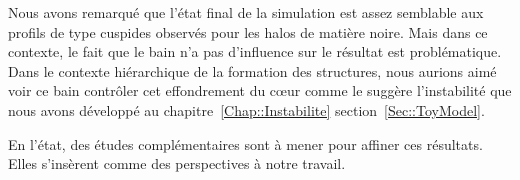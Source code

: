 		Nous avons remarqué que l'état final de la simulation est assez semblable aux profils de type cuspides observés pour les halos de
		matière noire. Mais dans ce contexte, le fait que le bain n'a pas d'influence sur le résultat est problématique. Dans le contexte
		hiérarchique de la formation des structures, nous aurions aimé voir ce bain contrôler cet effondrement du cœur comme le suggère
		l'instabilité que nous avons développé au chapitre~\ref{Chap::Instabilite} section~\ref{Sec::ToyModel}.

		En l'état, des études complémentaires sont à mener pour affiner ces résultats. Elles s'insèrent comme des perspectives à notre travail.
